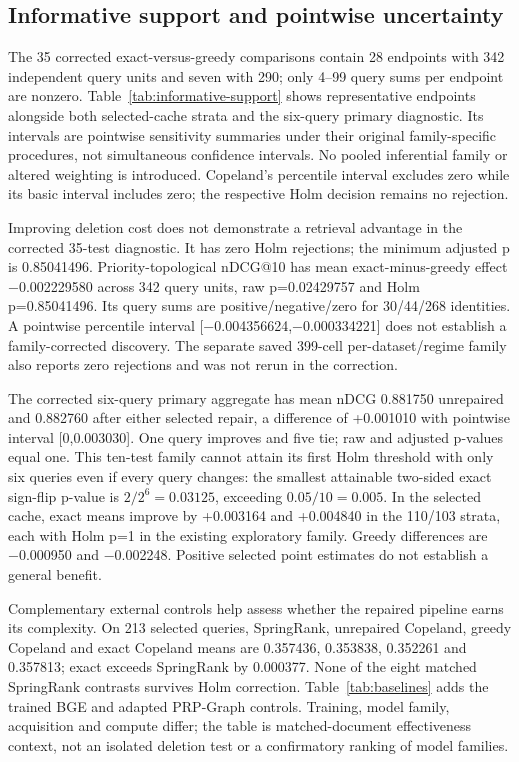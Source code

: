 \documentclass[pdflatex,iicol,sn-basic,Numbered]{sn-jnl}
\begin{document}
\subsection{Informative support and pointwise uncertainty}
The 35 corrected exact-versus-greedy comparisons contain 28 endpoints with 342 independent query units and seven with 290; only 4--99 query sums per endpoint are nonzero. Table~\ref{tab:informative-support} shows representative endpoints alongside both selected-cache strata and the six-query primary diagnostic. Its intervals are pointwise sensitivity summaries under their original family-specific procedures, not simultaneous confidence intervals. No pooled inferential family or altered weighting is introduced. Copeland's percentile interval excludes zero while its basic interval includes zero; the respective Holm decision remains no rejection.

Improving deletion cost does not demonstrate a retrieval advantage in the corrected 35-test diagnostic. It has zero Holm rejections; the minimum adjusted p is 0.85041496. Priority-topological nDCG@10 has mean exact-minus-greedy effect −0.002229580 across 342 query units, raw p=0.02429757 and Holm p=0.85041496. Its query sums are positive/negative/zero for 30/44/268 identities. A pointwise percentile interval [−0.004356624,−0.000334221] does not establish a family-corrected discovery. The separate saved 399-cell per-dataset/regime family also reports zero rejections and was not rerun in the correction.


The corrected six-query primary aggregate has mean nDCG 0.881750 unrepaired and 0.882760 after either selected repair, a difference of +0.001010 with pointwise interval [0,0.003030]. One query improves and five tie; raw and adjusted p-values equal one. This ten-test family cannot attain its first Holm threshold with only six queries even if every query changes: the smallest attainable two-sided exact sign-flip p-value is $2/2^6=0.03125$, exceeding $0.05/10=0.005$. In the selected cache, exact means improve by +0.003164 and +0.004840 in the 110/103 strata, each with Holm p=1 in the existing exploratory family. Greedy differences are −0.000950 and −0.002248. Positive selected point estimates do not establish a general benefit.

Complementary external controls help assess whether the repaired pipeline earns its complexity. On 213 selected queries, SpringRank, unrepaired Copeland, greedy Copeland and exact Copeland means are 0.357436, 0.353838, 0.352261 and 0.357813; exact exceeds SpringRank by 0.000377. None of the eight matched SpringRank contrasts survives Holm correction. Table~\ref{tab:baselines} adds the trained BGE and adapted PRP-Graph controls. Training, model family, acquisition and compute differ; the table is matched-document effectiveness context, not an isolated deletion test or a confirmatory ranking of model families.
\end{document}

